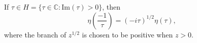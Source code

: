 If $\tau \in H = \{\tau \in \mathbb{C} : \text{Im}(\tau) > 0\}$, then
$$\eta\left(\frac{-1}{\tau}\right) = (-i\tau)^{1/2} \eta(\tau),$$
where the branch of $z^{1/2}$ is chosen to be positive when $z > 0$.

